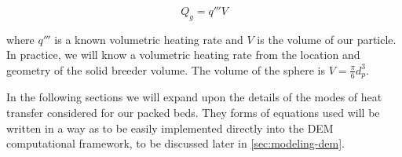 \begin{equation}\label{eq:nuclear-heating-term}
	Q_g = q'''V
\end{equation}

where $q'''$ is a known volumetric heating rate and $V$ is the volume of our particle. In practice, we will know a volumetric heating rate from the location and geometry of the solid breeder volume. The volume of the sphere is $V = \frac{\pi}{6} d_p^3$.

In the following sections we will expand upon the details of the modes of heat transfer considered for our packed beds. They forms of equations used will be written in a way as to be easily implemented directly into the DEM computational framework, to be discussed later in \cref{sec:modeling-dem}.








